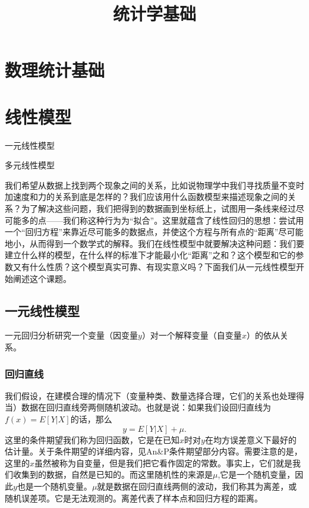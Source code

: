 \documentclass[lang=cn,10pt]{elegantbook}
\title{统计学基础}
\begin{document}
	
	
	\maketitle
	\frontmatter
	
	\tableofcontents
	
	\mainmatter
    \chapter{数理统计基础}

    \chapter{线性模型}
    \begin{introduction}
    \item 一元线性模型
    \item 多元线性模型
    \end{introduction}
    我们希望从数据上找到两个现象之间的关系，比如说物理学中我们寻找质量不变时加速度和力的关系到底是怎样的？我们应该用什么函数模型来描述现象之间的关系？为了解决这些问题，我们把得到的数据画到坐标纸上，试图用一条线来经过尽可能多的点——我们称这种行为为“拟合”。这里就蕴含了线性回归的思想：尝试用一个“回归方程”来靠近尽可能多的数据点，并使这个方程与所有点的“距离”尽可能地小，从而得到一个数学式的解释。我们在线性模型中就要解决这种问题：我们要建立什么样的模型，在什么样的标准下才能最小化“距离”之和？这个模型和它的参数又有什么性质？这个模型真实可靠、有现实意义吗？下面我们从一元线性模型开始阐述这个课题。
    \section{一元线性模型}
    一元回归分析研究一个变量（因变量\(y\)）对一个解释变量（自变量\(x\)）的依从关系。
    \subsection{回归直线}

    我们假设，在建模合理的情况下（变量种类、数量选择合理，它们的关系也处理得当）数据在回归直线旁两侧随机波动。也就是说：如果我们设回归直线为\(f(x)=E[Y|X]\)的话，那么
    \[y=E[Y|X]+\mu.\]
    这里的条件期望我们称为回归函数，它是在已知\(x\)时对\(y\)在均方误差意义下最好的估计量。关于条件期望的详细内容，见An\&P条件期望部分内容。需要注意的是，这里的\(x\)虽然被称为自变量，但是我们把它看作固定的常数。事实上，它们就是我们收集到的数据，自然是已知的。而这里随机性的来源是\(\mu\),它是一个随机变量，因此\(y\)也是一个随机变量。\(\mu\)就是数据在回归直线两侧的波动，我们称其为离差，或随机误差项。它是无法观测的。离差代表了样本点和回归方程的距离。
\end{document}
